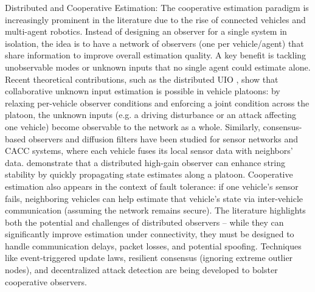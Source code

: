 Distributed and Cooperative Estimation: The cooperative estimation paradigm is increasingly prominent in the literature due to the rise of connected vehicles and multi-agent robotics. Instead of designing an observer for a single system in isolation, the idea is to have a network of observers (one per vehicle/agent) that share information to improve overall estimation quality. A key benefit is tackling unobservable modes or unknown inputs that no single agent could estimate alone. 
Recent theoretical contributions, such as the distributed UIO \cite{zhao2025bridgingcentralizeddistributedframeworks}, show that collaborative unknown input estimation is possible in vehicle platoons: by relaxing per-vehicle observer conditions and enforcing a joint condition across the platoon, the unknown inputs (e.g. a driving disturbance or an attack affecting one vehicle) become observable to the network as a whole. Similarly, consensus-based observers and diffusion filters have been studied for sensor networks and CACC systems, where each vehicle fuses its local sensor data with neighbors’ data. \cite{MengDistributedHighGainObserver} demonstrate that a distributed high-gain observer can enhance string stability by quickly propagating state estimates along a platoon. Cooperative estimation also appears in the context of fault tolerance: if one vehicle’s sensor fails, neighboring vehicles can help estimate that vehicle’s state via inter-vehicle communication (assuming the network remains secure). The literature highlights both the potential and challenges of distributed observers – while they can significantly improve estimation under connectivity, they must be designed to handle communication delays, packet losses, and potential spoofing. Techniques like event-triggered update laws, resilient consensus (ignoring extreme outlier nodes), and decentralized attack detection are being developed to bolster cooperative observers.

